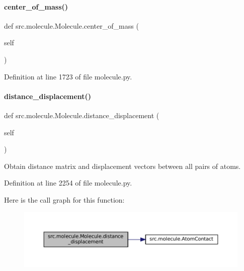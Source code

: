 \paragraph{\texorpdfstring{center\+\_\+of\+\_\+mass()}{center\_of\_mass()}}
{\footnotesize\ttfamily def src.\+molecule.\+Molecule.\+center\+\_\+of\+\_\+mass (\begin{DoxyParamCaption}\item[{}]{self }\end{DoxyParamCaption})}



Definition at line 1723 of file molecule.\+py.

\mbox{\label{classsrc_1_1molecule_1_1Molecule_a29b2035c5e476fb22707d6c17eaf5e3e}} 
\paragraph{\texorpdfstring{distance\+\_\+displacement()}{distance\_displacement()}}
{\footnotesize\ttfamily def src.\+molecule.\+Molecule.\+distance\+\_\+displacement (\begin{DoxyParamCaption}\item[{}]{self }\end{DoxyParamCaption})}



Obtain distance matrix and displacement vectors between all pairs of atoms. 



Definition at line 2254 of file molecule.\+py.

Here is the call graph for this function\+:
\nopagebreak
\begin{figure}[H]
\begin{center}
\leavevmode
\includegraphics[width=350pt]{classsrc_1_1molecule_1_1Molecule_a29b2035c5e476fb22707d6c17eaf5e3e_cgraph}
\end{center}
\end{figure}
\mbox{\label{classsrc_1_1molecule_1_1Molecule_ac9ca356c6a6ea6d5b470d819ab473f84}} 
